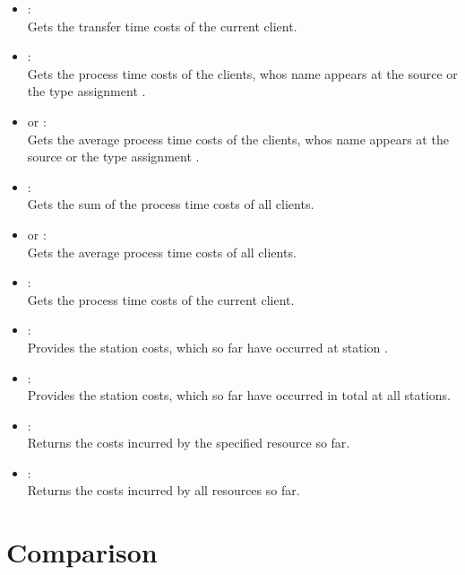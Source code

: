\begin{itemize}
\item
{}:\\
Gets the transfer time costs of the current client.

\item
{}:\\
Gets the process time costs of the clients, whos name appears at the source or the type assignment .

\item
{} or :\\
Gets the average process time costs of the clients, whos name appears at the source or the type assignment .

\item
{}:\\
Gets the sum of the process time costs of all clients.

\item
{} or :\\
Gets the average process time costs of all clients.

\item
{}:\\
Gets the process time costs of the current client.

\item
{}:\\
Provides the station costs, which so far have occurred at station .

\item
{}:\\
Provides the station costs, which so far have occurred in total at all stations.

\item
{}:\\
Returns the costs incurred by the specified resource so far.

\item
{}:\\
Returns the costs incurred by all resources so far.

\end{itemize}



\chapter{Comparison}

